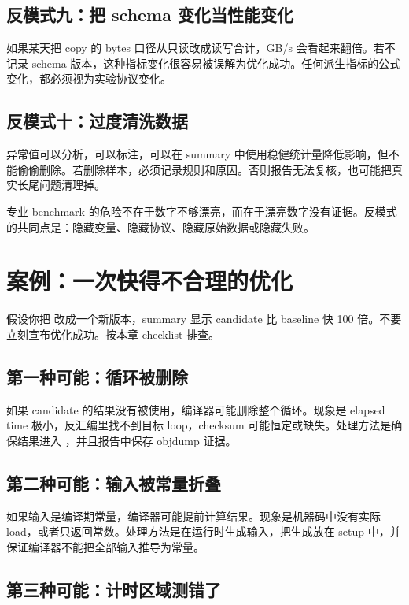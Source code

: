 \subsection{反模式九：把 schema 变化当性能变化}

如果某天把 copy 的 bytes 口径从只读改成读写合计，GB/s 会看起来翻倍。若不记录 schema 版本，这种指标变化很容易被误解为优化成功。任何派生指标的公式变化，都必须视为实验协议变化。

\subsection{反模式十：过度清洗数据}

异常值可以分析，可以标注，可以在 summary 中使用稳健统计量降低影响，但不能偷偷删除。若删除样本，必须记录规则和原因。否则报告无法复核，也可能把真实长尾问题清理掉。

\begin{warningbox}
专业 benchmark 的危险不在于数字不够漂亮，而在于漂亮数字没有证据。反模式的共同点是：隐藏变量、隐藏协议、隐藏原始数据或隐藏失败。
\end{warningbox}

\section{案例：一次快得不合理的优化}

假设你把  改成一个新版本，summary 显示 candidate 比 baseline 快 100 倍。不要立刻宣布优化成功。按本章 checklist 排查。

\subsection{第一种可能：循环被删除}

如果 candidate 的结果没有被使用，编译器可能删除整个循环。现象是 elapsed time 极小，反汇编里找不到目标 loop，checksum 可能恒定或缺失。处理方法是确保结果进入 ，并且报告中保存 objdump 证据。

\subsection{第二种可能：输入被常量折叠}

如果输入是编译期常量，编译器可能提前计算结果。现象是机器码中没有实际 load，或者只返回常数。处理方法是在运行时生成输入，把生成放在 setup 中，并保证编译器不能把全部输入推导为常量。

\subsection{第三种可能：计时区域测错了}


